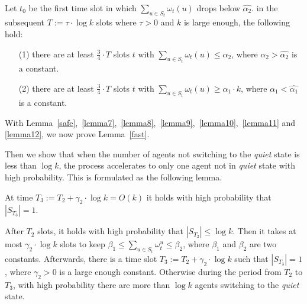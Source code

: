 \begin{lemma}
    \label{lemma12}
    Let $t_0$ be the first time slot in which ${\sum}_{u\in S_t}\omega_t(u)$
    drops below $\hat{\alpha_2}$. in the subsequent $T :=\tau\cdot\log k$ slots
    where $\tau > 0$ and $k$ is large enough, the following hold:
    \begin{itemize}
        \item[(1)] there are at least $\frac{3}{4}\cdot T$ slots $t$
        with ${\sum}_{u\in S_t}\omega_t(u) \leq \alpha_2$, where $\alpha_2 > \hat{\alpha_2}$
        is a constant.
        \item[(2)] there are at least $\frac{3}{4}\cdot T$ slots $t$
        with ${\sum}_{u\in S_t}\omega_t(u) \geq \alpha_1\cdot k$, where $\alpha_1 < \hat{\alpha_1}$
        is a constant.
    \end{itemize}
\end{lemma}


With Lemma~\ref{safe},~\ref{lemma7},~\ref{lemma8},~\ref{lemma9},~\ref{lemma10},~\ref{lemma11} and
\ref{lemma12}, we now prove Lemma~\ref{fast}.


Then we show that when the number of agents not switching to 
the \emph{quiet} state is less than $\log k$, the process accelerates to 
only one agent not in \emph{quiet} state with high probability.
This is formulated as the following lemma.

\begin{lemma}
    \label{slow}
    At time $T_3 :=T_2 +\gamma_2 \cdot \log k = O(k)$ it holds with high
    probability that $|S_{T_3}| = 1$.
\end{lemma}
\begin{IEEEproof}
    After $T_2$ slots, it holds with high probability 
    that $|S_{T_2}| \leq \log k$. Then it takes at most $\gamma_2 \cdot \log k$
    slots to keep $\beta_1 \leq \sum_{u\in S_t} \omega_t^u \leq \beta_2$,
    where $\beta_1$ and $\beta_2$ are two constants.
    Afterwards, there is a time slot $T_3 :=T_2 +\gamma_2\cdot\log k$ such that
    $|S_{T_3}| = 1$, where $\gamma_2 > 0$ is a large enough constant. 
    Otherwise during the period from $T_2$ to $T_3$,
    with high probability there are 
    more than $\log k$ agents switching to
    the \emph{quiet} state.
\end{IEEEproof}

